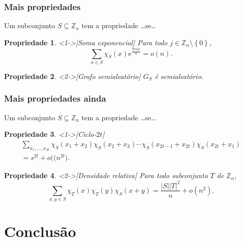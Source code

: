 \documentclass{beamer}
\def\MMe{\mathrm{e}} %
\def\MMi{\mathrm{i}} %
\def\MMpi{\mathrm{\pi}}
\def\MMZ{\mathbb{Z}} %
\def\MMp{\mathrm{.}} %
\def\chaves#1{\left\{ #1 \right\}} %
\def\cardi#1{\lvert #1 \rvert} %
\def\cj#1{\chaves{#1}} %
\theoremstyle{teoaxicorlem}
\newtheorem{Propr}{Propriedade}
\theoremstyle{defnotnom}
\begin{document}
\begin{frame}
  \frametitle{Mais propriedades}
  Um subconjunto $S\subseteq\MMZ_n$ tem a propriedade \dots se\dots
  \begin{Propr}<1->[Soma exponencial]
    Para todo $j\in\MMZ_n\setminus\cj{0}$,
    \begin{equation*}
      \sum_{x\in S}\chi_S(x){\MMe}^{\frac{2\MMpi\MMi jx}{n}}=o(n)\MMp
    \end{equation*}
  \end{Propr}
  \vfill
  \begin{Propr}<2->[Grafo semialeatório]
    $G_S$ é semialeatório.
  \end{Propr}
\end{frame}

\begin{frame}
  \frametitle{Mais propriedades ainda}
  Um subconjunto $S\subseteq\MMZ_n$ tem a propriedade \dots se\dots
  \begin{Propr}<1->[Ciclo-$2t$]
    \begin{equation*}
      \begin{gathered}
        \sum_{x_1,\dotsc,x_{2t}}\chi_S(x_1+x_2)\chi_S(x_2+x_3)\dotsb
        \chi_S(x_{2t-1}+x_{2t})\chi_S(x_{2t}+x_1) \\
        = s^{2t}+o\bigl((n^{2t}\bigr)\MMp
      \end{gathered}
    \end{equation*}
  \end{Propr}
  \vfill
  \begin{Propr}<2->[Densidade relativa]
    Para todo subconjunto $T$ de $\MMZ_n$,
    \begin{equation*}
      \sum_{x,y\in S}\chi_T(x)\chi_T(y)\chi_S(x+y) =
      \frac{\cardi{S}\cardi{T}^2}{n}+o(n^2)\MMp
    \end{equation*}
  \end{Propr}
\end{frame}

\section{Conclusão}
\end{document}
